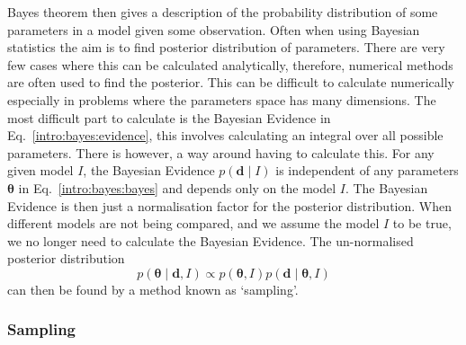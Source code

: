 Bayes theorem then gives a description of the probability distribution of some
parameters in a model given some observation.  Often when using Bayesian
statistics the aim is to find posterior distribution of parameters.  There are
very few cases where this can be calculated analytically, therefore, numerical
methods are often used to find the posterior.  This
can be difficult to calculate numerically especially in problems where the
parameters space has many dimensions.  The most difficult part to calculate is
the Bayesian Evidence in Eq.~\ref{intro:bayes:evidence}, this involves calculating an
integral over all possible parameters.  There is however, a way around having
to calculate this.  For any given model $I$, the Bayesian Evidence $p({\bm d}\mid I)$ is
independent of any parameters ${\bm \theta}$ in
Eq.~\ref{intro:bayes:bayes} and depends only on the model $I$.
The Bayesian Evidence is then just a normalisation factor for the posterior
distribution.  When different models are not being compared, and we assume the
model $I$ to be true, we no longer need to calculate the Bayesian Evidence.  The
un-normalised posterior distribution
%
\begin{equation}
p({\bm \theta} \mid {\bm d}, I) \propto p({\bm \theta}, I)p({\bm d} \mid {\bm \theta}, I)
\end{equation}
can then be found by a method known as `sampling'.


\subsubsection{Sampling}

